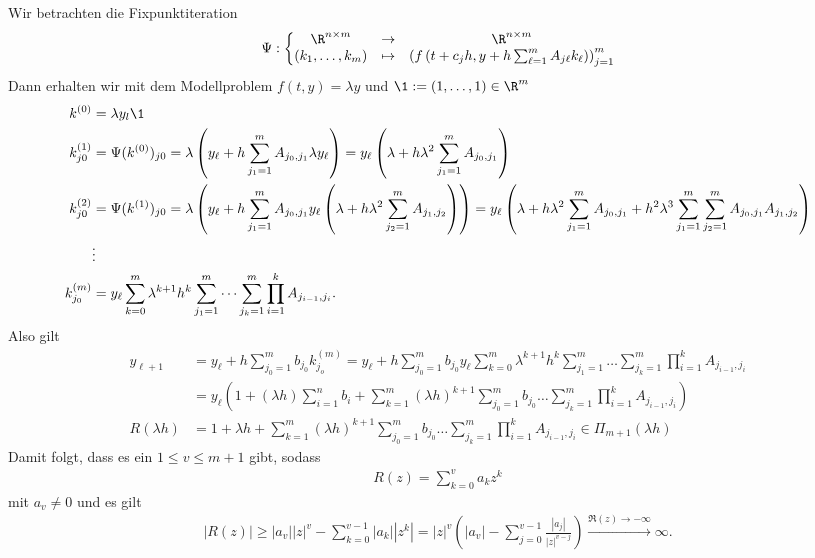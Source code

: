 \begin{solution}
Wir betrachten die Fixpunktiteration
\begin{align*}
  \Psi: \bigg\{\begin{matrix}
    \R^{n \times m} & \rightarrow & \R^{n \times m} \\
    (k_1,\dots,k_m) & \mapsto & \left(f\left(t + c_jh,y + h\sum_{\ell = 1}^m A_{j\ell}k_{\ell}\right)\right)_{j=1}^m
  \end{matrix}
\end{align*}
Dann erhalten wir mit dem Modellproblem $f(t,y) = \lambda y$ und $\1 := (1,\dots,1) \in \R^m$
\begin{align*}
  k^{(0)} &= \lambda y_l \1 \\
  k^{(1)}_{j0} &= \Psi(k^{(0)})_{j0}
  = \lambda\left(y_{\ell} + h\sum_{j_1 = 1}^mA_{j_0,j_1}\lambda y_{\ell}\right)
  = y_{\ell}\left(\lambda + h\lambda^2\sum_{j_1 = 1}^mA_{j_0,j_1}\right) \\
  k^{(2)}_{j0} &= \Psi(k^{(1)})_{j0}
  = \lambda\left(y_{\ell} + h\sum_{j_1 = 1}^mA_{j_0,j_1}y_{\ell}\left(\lambda + h\lambda^2
  \sum_{j_2 = 1}^mA_{j_1,j_2}\right)\right)
  = y_{\ell}\left(\lambda + h\lambda^2\sum_{j_1 = 1}^mA_{j_0,j_1}
  + h^2\lambda^3\sum_{j_1 = 1}^m\sum_{j_2 = 1}^m A_{j_0,j_1}A_{j_1,j_2}\right) \\
  &\vdots \\
  k^{(m)}_{j_0} &= y_{\ell}\sum_{k = 0}^m \lambda^{k+1}h^k\sum_{j_1 = 1}^m\dots\sum_{j_{k} = 1}^m
  \prod_{i=1}^k A_{j_{i-1}, j_i}.
\end{align*}
Also gilt
\begin{align*}
  y_{\ell+1} &= y_\ell + h\sum_{j_0 = 1}^{m} b_{j_0}k_{j_o}^{(m)} =
  y_\ell + h\sum_{j_0 = 1}^{m} b_{j_0}y_{\ell}\sum_{k = 0}^m \lambda^{k+1}h^k\sum_{j_1 = 1}^m\dots\sum_{j_{k} = 1}^m
  \prod_{i=1}^k A_{j_{i-1}, j_i} \\
  &= y_{\ell}\left(1 + (\lambda h)\sum_{i=1}^nb_i + \sum_{k=1}^m(\lambda h)^{k+1}
  \sum_{j_0 = 1}^mb_{j_0}\dots\sum_{j_k = 1}^m \prod_{i=1}^k A_{j_{i-1},j_i}\right) \\
  R(\lambda h) &= 1 + \lambda h + \sum_{k=1}^m(\lambda h)^{k+1}
  \sum_{j_0 = 1}^mb_{j_0}\dots\sum_{j_k = 1}^m \prod_{i=1}^k A_{j_{i-1},j_i}
  \in \Pi_{m+1}(\lambda h)
\end{align*}
Damit folgt, dass es ein $1 \leq v \leq m + 1$ gibt, sodass
\begin{align*}
  R(z) = \sum_{k= 0}^v a_kz^k
\end{align*}
mit $a_v \neq 0$ und es gilt
\begin{align*}
  |R(z)| \geq |a_v||z|^v - \sum_{k=0}^{v-1}|a_k||z^k|
  = |z|^v\left(|a_v| - \sum_{j = 0}^{v - 1}\frac{|a_j|}{|z|^{v - j}}\right)
  \stackrel{\Re(z) \rightarrow -\infty}{\longrightarrow} \infty.
\end{align*}
\end{solution}
